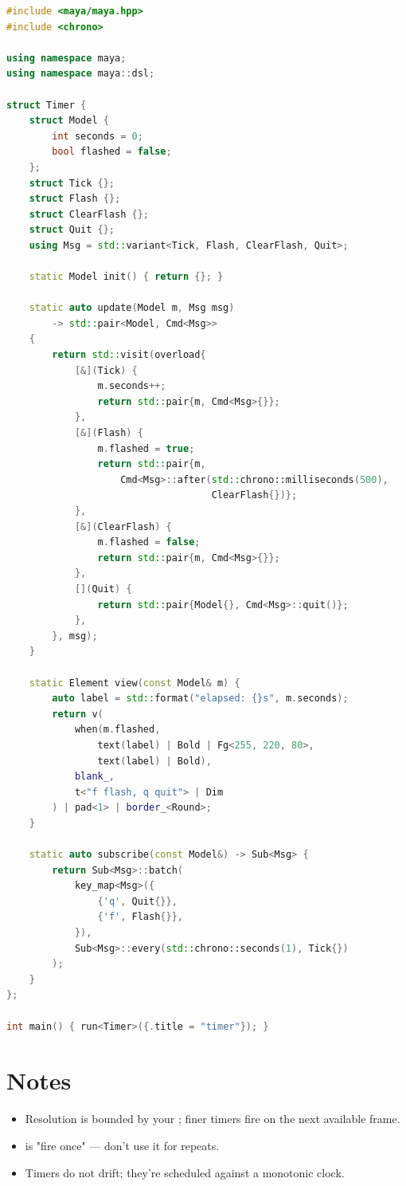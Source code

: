 \begin{lstlisting}[language=C++]
#include <maya/maya.hpp>
#include <chrono>

using namespace maya;
using namespace maya::dsl;

struct Timer {
    struct Model {
        int seconds = 0;
        bool flashed = false;
    };
    struct Tick {};
    struct Flash {};
    struct ClearFlash {};
    struct Quit {};
    using Msg = std::variant<Tick, Flash, ClearFlash, Quit>;

    static Model init() { return {}; }

    static auto update(Model m, Msg msg)
        -> std::pair<Model, Cmd<Msg>>
    {
        return std::visit(overload{
            [&](Tick) {
                m.seconds++;
                return std::pair{m, Cmd<Msg>{}};
            },
            [&](Flash) {
                m.flashed = true;
                return std::pair{m,
                    Cmd<Msg>::after(std::chrono::milliseconds(500),
                                    ClearFlash{})};
            },
            [&](ClearFlash) {
                m.flashed = false;
                return std::pair{m, Cmd<Msg>{}};
            },
            [](Quit) {
                return std::pair{Model{}, Cmd<Msg>::quit()};
            },
        }, msg);
    }

    static Element view(const Model& m) {
        auto label = std::format("elapsed: {}s", m.seconds);
        return v(
            when(m.flashed,
                text(label) | Bold | Fg<255, 220, 80>,
                text(label) | Bold),
            blank_,
            t<"f flash, q quit"> | Dim
        ) | pad<1> | border_<Round>;
    }

    static auto subscribe(const Model&) -> Sub<Msg> {
        return Sub<Msg>::batch(
            key_map<Msg>({
                {'q', Quit{}},
                {'f', Flash{}},
            }),
            Sub<Msg>::every(std::chrono::seconds(1), Tick{})
        );
    }
};

int main() { run<Timer>({.title = "timer"}); }
\end{lstlisting}

\section{Notes}

\begin{itemize}[leftmargin=*]
  \item Resolution is bounded by your ; finer
    timers fire on the next available frame.
  \item {} is "fire once" — don't use it for
    repeats.
  \item Timers do not drift; they're scheduled against a
    monotonic clock.
\end{itemize}

